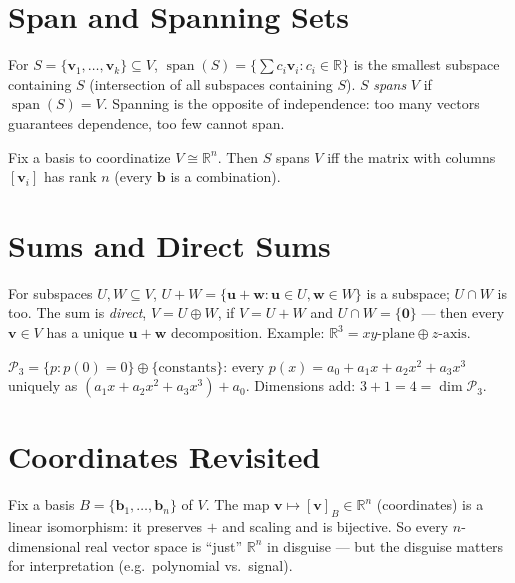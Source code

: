 \section{Span and Spanning Sets}
\label{sec:span-detail}
For $S=\{\mathbf{v}_1,\dots,\mathbf{v}_k\}\subseteq V$, $\operatorname{span}(S)=\{\sum c_i\mathbf{v}_i:c_i\in\mathbb{R}\}$ is the smallest subspace containing $S$ (intersection of all subspaces containing $S$). $S$ \emph{spans} $V$ if $\operatorname{span}(S)=V$. Spanning is the opposite of independence: too many vectors guarantees dependence, too few cannot span.

\begin{theorem}
Fix a basis to coordinatize $V\cong\mathbb{R}^n$. Then $S$ spans $V$ iff the matrix with columns $[{\mathbf{v}_i}]$ has rank $n$ (every $\mathbf{b}$ is a combination).
\end{theorem}

\section{Sums and Direct Sums}
\label{sec:sums}
For subspaces $U,W\subseteq V$, $U+W=\{\mathbf{u}+\mathbf{w}:\mathbf{u}\in U,\mathbf{w}\in W\}$ is a subspace; $U\cap W$ is too. The sum is \emph{direct}, $V=U\oplus W$, if $V=U+W$ and $U\cap W=\{\mathbf{0}\}$ --- then every $\mathbf{v}\in V$ has a unique $\mathbf{u}+\mathbf{w}$ decomposition. Example: $\mathbb{R}^3=\text{$xy$-plane}\oplus\text{$z$-axis}$.

\begin{example}
$\mathcal{P}_3=\{p:p(0)=0\}\oplus\{ \text{constants}\}$: every $p(x)=a_0+a_1x+a_2x^2+a_3x^3$ uniquely as $(a_1x+a_2x^2+a_3x^3)+a_0$. Dimensions add: $3+1=4=\dim\mathcal{P}_3$.
\end{example}

\section{Coordinates Revisited}
\label{sec:coords-vec}
Fix a basis $B=\{\mathbf{b}_1,\dots,\mathbf{b}_n\}$ of $V$. The map $\mathbf{v}\mapsto[\mathbf{v}]_B\in\mathbb{R}^n$ (coordinates) is a linear isomorphism: it preserves $+$ and scaling and is bijective. So every $n$-dimensional real vector space is ``just'' $\mathbb{R}^n$ in disguise --- but the disguise matters for interpretation (e.g.\ polynomial vs.\ signal).



